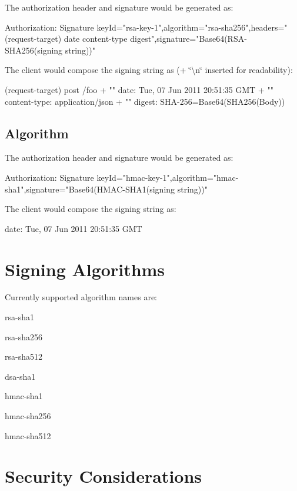 The authorization header and signature would be generated as\+: \begin{DoxyVerb}Authorization: Signature keyId="rsa-key-1",algorithm="rsa-sha256",headers="(request-target) date content-type digest",signature="Base64(RSA-SHA256(signing string))"
\end{DoxyVerb}


The client would compose the signing string as ({\ttfamily + \char`\"{}\textbackslash{}n\char`\"{}} inserted for readability)\+: \begin{DoxyVerb}(request-target) post /foo + "\n"
date: Tue, 07 Jun 2011 20:51:35 GMT + "\n"
content-type: application/json + "\n"
digest: SHA-256=Base64(SHA256(Body))
\end{DoxyVerb}


\subsection*{Algorithm}

The authorization header and signature would be generated as\+: \begin{DoxyVerb}Authorization: Signature keyId="hmac-key-1",algorithm="hmac-sha1",signature="Base64(HMAC-SHA1(signing string))"
\end{DoxyVerb}


The client would compose the signing string as\+: \begin{DoxyVerb}date: Tue, 07 Jun 2011 20:51:35 GMT
\end{DoxyVerb}


\section*{Signing Algorithms}

Currently supported algorithm names are\+:


\begin{DoxyItemize}
\item rsa-\/sha1
\item rsa-\/sha256
\item rsa-\/sha512
\item dsa-\/sha1
\item hmac-\/sha1
\item hmac-\/sha256
\item hmac-\/sha512
\end{DoxyItemize}

\section*{Security Considerations}

